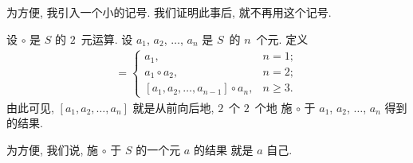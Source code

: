 \documentclass[../libro.tex]{subfiles}
\begin{document}
为方便,
我引入一个小的记号.
我们证明此事后, 就不再用这个记号.

\begin{definition}
    设 \(\circ\) 是 \(S\) 的 \(2\)~元运算.
    设 \(a_1\), \(a_2\), \(\dots\), \(a_n\) 是
    \(S\)~的 \(n\)~个元.
    定义
    \begin{align*}
        [a_1, a_2, \dots, a_n] =
        \begin{cases}
            a_1,
            & n = 1;    \\
            a_1 \circ a_2,
            & n = 2;    \\
            [a_1, a_2, \dots, a_{n-1}] \circ a_n,
            & n \geq 3.
        \end{cases}
    \end{align*}
    由此可见, \([a_1, a_2, \dots, a_n]\)
    就是从前向后地, \(2\)~个 \(2\)~个地%
    施 \(\circ\) 于
    \(a_1\), \(a_2\), \(\dots\), \(a_n\)
    得到的结果.
\end{definition}

为方便, 我们说,
施 \(\circ\) 于 \(S\) 的一个元 \(a\) 的结果%
就是 \(a\) 自己.
\end{document}
